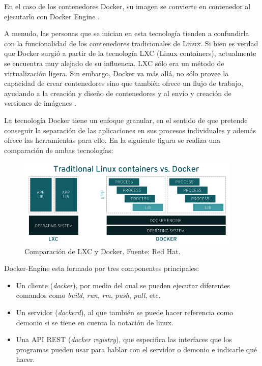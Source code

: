 En el caso de los contenedores Docker, su imagen se convierte en contenedor al ejecutarlo con Docker Engine . 

A menudo, las personas que se inician en esta tecnología tienden a confundirla con la funcionalidad de los contenedores tradicionales de Linux. Si bien es verdad que Docker surgió a partir de la tecnología LXC (Linux containers), actualmente se encuentra muy alejado de su influencia. LXC sólo era un método de virtualización ligera. Sin embargo, Docker va más allá, no sólo provee la capacidad de crear contenedores sino que también ofrece un flujo de trabajo, ayudando a la creación y diseño de contenedores y al envío y creación de versiones de imágenes .

La tecnología Docker tiene un enfoque granular, en el sentido de que pretende conseguir la separación de las aplicaciones en sus procesos individuales y además ofrece las herramientas para ello. En la siguiente figura se realiza una comparación de ambas tecnologías:

\begin{figure}[ht]
	\begin{center}
		\includegraphics[width = 0.95\textwidth]{Figuras/Docker_LXC.PNG}
	\end{center}
	\caption{\label{fig:Docker_LXC} Comparación de LXC y Docker. Fuente: Red Hat.}
\end{figure}

Docker-Engine esta formado por tres componentes principales:
\begin{itemize}[leftmargin=+.5in]
    \item Un cliente (\textit{docker}), por medio del cual se pueden ejecutar diferentes comandos como \textit{build}, \textit{run}, \textit{rm}, \textit{push}, \textit{pull}, etc. 
    \item Un servidor (\textit{dockerd}), al que también se puede hacer referencia como demonio si se tiene en cuenta la notación de linux.
    \item Una API REST (\textit{docker registry}), que especifica las interfaces que los programas pueden usar para hablar con el servidor o demonio e indicarle qué hacer.
\end{itemize}

